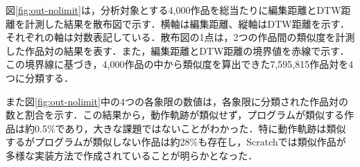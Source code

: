 \documentclass[T,J]{fose} %
\newcommand{\todo}[1]{\colorbox{yellow}{{\bf TODO}:}{\color{red} {\textbf{[#1]}}}}
\begin{document}

図\ref{fig:out-nolimit}は，分析対象とする4,000作品を総当たりに編集距離とDTW距離を計測した結果を散布図で示す．横軸は編集距離、縦軸はDTW距離を示す．それぞれの軸は対数表記している．散布図の1点は，2つの作品間の類似度を計測した作品対の結果を表す．また，編集距離とDTW距離の境界値を赤線で示す．この境界線に基づき，4,000作品の中から類似度を算出できた7,595,815作品対を4つに分類する．

また図\ref{fig:out-nolimit}中の4つの各象限の数値は，各象限に分類された作品対の数と割合を示す．この結果から，動作軌跡が類似せず，プログラムが類似する作品は約0.5\%であり，大きな課題ではないことがわかった．特に動作軌跡は類似するがプログラムが類似しない作品は約28\%も存在し，Scratchでは類似作品が多様な実装方法で作成されていることが明らかとなった．









\end{document}
